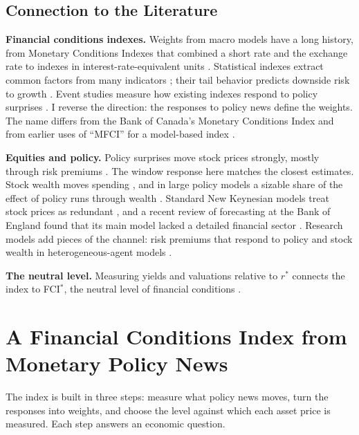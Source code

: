 \documentclass[11pt]{article}
\newcommand{\rs}{r^{*}}
\begin{document}
\subsection{Connection to the Literature}
\textbf{Financial conditions indexes.} Weights from macro models have a long history, from Monetary Conditions Indexes that combined a short rate and the exchange rate \citep{eika1996,batini2002} to indexes in interest-rate-equivalent units \citep{hatzius2010,ajello2023,bletzinger2026}. Statistical indexes extract common factors from many indicators \citep{brave2011}; their tail behavior predicts downside risk to growth \citep{adrian2019}. Event studies measure how existing indexes respond to policy surprises \citep{sack2023,arnaut2024}. I reverse the direction: the responses to policy news define the weights. The name differs from the Bank of Canada's Monetary Conditions Index and from earlier uses of ``MFCI'' for a model-based index \citep{beaton2009}.

\textbf{Equities and policy.} Policy surprises move stock prices strongly, mostly through risk premiums \citep{bernanke2005,rigobon2004,gurkaynak2005,bauer2023}. The window response here matches the closest estimates. Stock wealth moves spending \citep{chodorowreich2021}, and in large policy models a sizable share of the effect of policy runs through wealth \citep{ludvigson2002}. Standard New Keynesian models treat stock prices as redundant \citep{castelnuovo2010}, and a recent review of forecasting at the Bank of England found that its main model lacked a detailed financial sector \citep{bernanke2024}. Research models add pieces of the channel: risk premiums that respond to policy \citep{kekre2022,pflueger2022} and stock wealth in heterogeneous-agent models \citep{auclert2020}.

\textbf{The neutral level.} Measuring yields and valuations relative to $\rs$ connects the index to FCI$^*$, the neutral level of financial conditions \citep{caballero2026}.

\section{A Financial Conditions Index from Monetary Policy News}\label{sec:method}
The index is built in three steps: measure what policy news moves, turn the responses into weights, and choose the level against which each asset price is measured. Each step answers an economic question.
\end{document}
